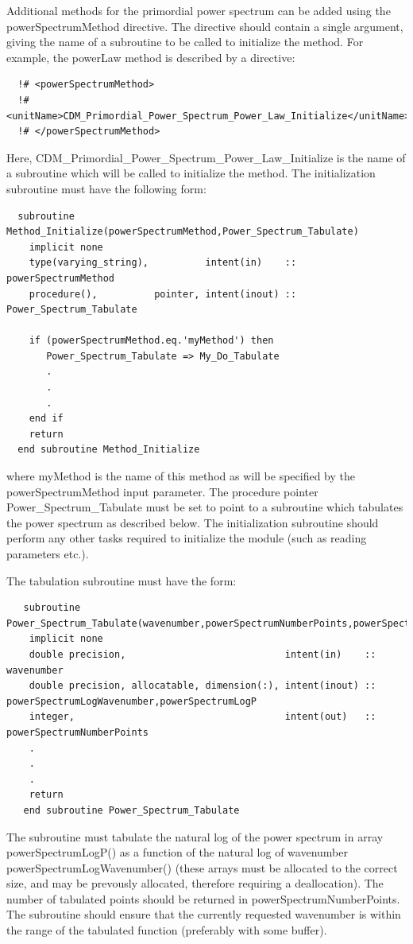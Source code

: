 Additional methods for the primordial power spectrum can be added using the {\normalfont \ttfamily powerSpectrumMethod} directive. The directive should contain a single argument, giving the name of a subroutine to be called to initialize the method. For example, the {\normalfont \ttfamily powerLaw} method is described by a directive:
\begin{verbatim}
  !# <powerSpectrumMethod>
  !#  <unitName>CDM_Primordial_Power_Spectrum_Power_Law_Initialize</unitName>
  !# </powerSpectrumMethod>
\end{verbatim}
Here, {\normalfont \ttfamily CDM\_Primordial\_Power\_Spectrum\_Power\_Law\_Initialize} is the name of a subroutine which will be called to initialize the method. The initialization subroutine must have the following form:
\begin{verbatim}
  subroutine Method_Initialize(powerSpectrumMethod,Power_Spectrum_Tabulate)
    implicit none
    type(varying_string),          intent(in)    :: powerSpectrumMethod
    procedure(),          pointer, intent(inout) :: Power_Spectrum_Tabulate
    
    if (powerSpectrumMethod.eq.'myMethod') then
       Power_Spectrum_Tabulate => My_Do_Tabulate
       .
       .
       .
    end if
    return
  end subroutine Method_Initialize
\end{verbatim}
where {\normalfont \ttfamily myMethod} is the name of this method as will be specified by the {\normalfont \ttfamily powerSpectrumMethod} input parameter. The procedure pointer {\normalfont \ttfamily Power\_Spectrum\_Tabulate} must be set to point to a subroutine which tabulates the power spectrum as described below. The initialization subroutine should perform any other tasks required to initialize the module (such as reading parameters etc.).

The tabulation subroutine must have the form:
\begin{verbatim}
   subroutine Power_Spectrum_Tabulate(wavenumber,powerSpectrumNumberPoints,powerSpectrumLogWavenumber,powerSpectrumLogP)
    implicit none
    double precision,                            intent(in)    :: wavenumber
    double precision, allocatable, dimension(:), intent(inout) :: powerSpectrumLogWavenumber,powerSpectrumLogP
    integer,                                     intent(out)   :: powerSpectrumNumberPoints
    .
    .
    .
    return
   end subroutine Power_Spectrum_Tabulate
\end{verbatim}
The subroutine must tabulate the natural log of the power spectrum in array {\normalfont \ttfamily powerSpectrumLogP()} as a function of the natural log of wavenumber {\normalfont \ttfamily powerSpectrumLogWavenumber()} (these arrays must be allocated to the correct size, and may be prevously allocated, therefore requiring a deallocation). The number of tabulated points should be returned in {\normalfont \ttfamily powerSpectrumNumberPoints}. The subroutine should ensure that the currently requested {\normalfont \ttfamily wavenumber} is within the range of the tabulated function (preferably with some buffer).

